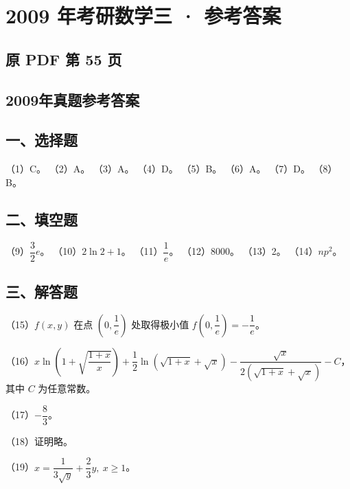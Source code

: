\documentclass[UTF8,12pt]{ctexart}
\begin{document}
\section*{2009 年考研数学三 · 参考答案}
\subsection*{原 PDF 第 55 页}

\subsection*{2009年真题参考答案}

\subsection*{一、选择题}

（1）C。 （2）A。 （3）A。 （4）D。 （5）B。 （6）A。 （7）D。 （8）B。


\subsection*{二、填空题}

（9）\(\displaystyle \dfrac{\displaystyle 3}{\displaystyle 2}e\)。 （10）\(\displaystyle 2\ln2+1\)。 （11）\(\displaystyle \dfrac{\displaystyle 1}{\displaystyle e}\)。 （12）8000。 （13）2。 （14）\(\displaystyle np^2\)。


\subsection*{三、解答题}

（15）\(\displaystyle f(x,\allowbreak y)\) 在点 \(\displaystyle \left(0,\allowbreak \dfrac{\displaystyle 1}{\displaystyle e}\right)\) 处取得极小值 \(\displaystyle f\left(0,\allowbreak \dfrac{\displaystyle 1}{\displaystyle e}\right)=-\dfrac{\displaystyle 1}{\displaystyle e}\)。


（16）\(\displaystyle x\ln\left(1+\sqrt{\dfrac{\displaystyle 1+x}{\displaystyle x}}\right)+\dfrac{\displaystyle 1}{\displaystyle 2}\ln(\sqrt{1+x}+\sqrt x)-\dfrac{\displaystyle \sqrt x}{\displaystyle 2(\sqrt{1+x}+\sqrt x)}-C\)，其中 \(\displaystyle C\) 为任意常数。


（17）\(\displaystyle -\dfrac{\displaystyle 8}{\displaystyle 3}\)。


（18）证明略。


（19）\(\displaystyle x=\dfrac{\displaystyle 1}{\displaystyle 3\sqrt y}+\dfrac{\displaystyle 2}{\displaystyle 3}y,\allowbreak \ x\ge1\)。
\end{document}
